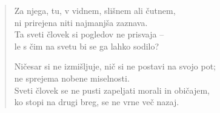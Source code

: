 \begin{verse}
Za njega, tu, v vidnem, slišnem ali čutnem,\\
ni prirejena niti najmanjša zaznava.\\
Ta sveti človek si pogledov ne prisvaja --\\
le s čim na svetu bi se ga lahko sodilo?

Ničesar si ne izmišljuje, nič si ne postavi na svojo pot;\\
ne sprejema nobene miselnosti.\\
Sveti človek se ne pusti zapeljati morali in običajem,\\
ko stopi na drugi breg, se ne vrne več nazaj.

\end{verse}


\clearpage
\begin{verse}


\end{verse}


\clearpage
\begin{verse}


\end{verse}

